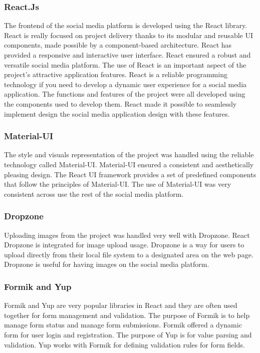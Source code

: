\subsubsection{React.Js}
The frontend of the social media platform is developed using the React library. React is really focused on project delivery thanks to its modular and reusable UI components, made possible by a component-based architecture. React has provided a responsive and interactive user interface. React ensured a robust and versatile social media platform. The use of React is an important aspect of the project's attractive application features. React is a reliable programming technology if you need to develop a dynamic user experience for a social media application. The functions and features of the project were all developed using the components used to develop them. React made it possible to seamlessly implement design the social media application design with these features.

\subsubsection{Material-UI}
The style and visuals representation of the project was handled using the reliable technology called Material-UI. Material-UI ensured a consistent and aesthetically pleasing design. The React UI framework provides a set of predefined components that follow the principles of Material-UI. The use of Material-UI was very consistent across use the rest of the social media platform.

\subsubsection{Dropzone}
Uploading images from the project was handled very well with Dropzone. React Dropzone is integrated for image upload usage. Dropzone is a way for users to upload directly from their local file system to a  designated area on the web page. Dropzone is useful for having images on the social media platform. 

\subsubsection{Formik and Yup}
Formik and Yup are very popular libraries in React and they are often used together for form management and validation. The purpose of Formik is to help manage form status and manage form submissions. Formik offered a dynamic form for user login and registration. The purpose of Yup is for value parsing and validation. Yup works with Formik for defining validation rules for form fields.


